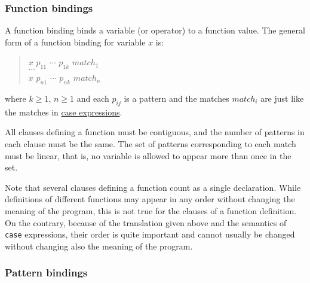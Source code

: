 \subsubsection{Function bindings} \label{fundef}

A function binding binds a variable (or operator) to a function value.
The general form of a function binding for variable $x$ is:
\begin{quote}
\begin{flushleft}
$x$ $p_{11}$ $\cdots$ $p_{1k}$ $match_1$\\
$\cdots$\\
$x$ $p_{n1}$ $\cdots$ $p_{nk}$ $match_n$\\
\end{flushleft}
\end{quote}
where $k\ge 1$, $n\ge 1$ and each $p_{ij}$ is a pattern and the matches $match_i$ are just like the matches in \hyperref[caseex]{case expressions}.

All clauses defining a function must be contiguous, and the number of patterns in each clause must be the same. The set of patterns corresponding to each match must be linear, that is, no variable is allowed to appear more than once in the set.


Note that several clauses defining a function count as a single  declaration. While definitions of different functions may appear in any order without changing the meaning of the program, this is not true for the clauses of a function definition. On the contrary, because of the translation given above and the semantics of \texttt{case} expressions, their order is quite important and cannot usually be changed without changing also the meaning of the program.

\subsubsection{Pattern bindings} \label{patdef}

